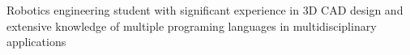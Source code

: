Robotics engineering student with significant experience in 3D CAD design and extensive knowledge of
multiple programing languages in multidisciplinary applications